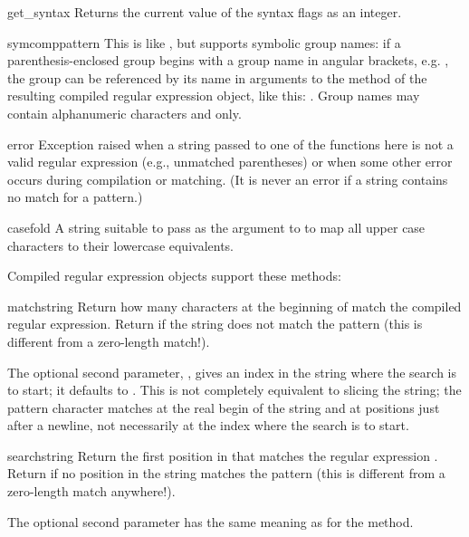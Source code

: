 \begin{funcdesc}{get_syntax}{}
  Returns the current value of the syntax flags as an integer.
\end{funcdesc}

\begin{funcdesc}{symcomp}{pattern}
This is like , but supports symbolic group names: if a
parenthesis-enclosed group begins with a group name in angular
brackets, e.g. , the group can
be referenced by its name in arguments to the  method of
the resulting compiled regular expression object, like this:
.  Group names may contain alphanumeric characters
and  only.
\end{funcdesc}

\begin{excdesc}{error}
  Exception raised when a string passed to one of the functions here
  is not a valid regular expression (e.g., unmatched parentheses) or
  when some other error occurs during compilation or matching.  (It is
  never an error if a string contains no match for a pattern.)
\end{excdesc}

\begin{datadesc}{casefold}
A string suitable to pass as the  argument to
 to map all upper case characters to their lowercase
equivalents.
\end{datadesc}

\noindent
Compiled regular expression objects support these methods:

\begin{funcdesc}{match}{string}
  Return how many characters at the beginning of  match
  the compiled regular expression.  Return  if the string
  does not match the pattern (this is different from a zero-length
  match!).
  
  The optional second parameter, , gives an index in the string
  where the search is to start; it defaults to .  This is not
  completely equivalent to slicing the string; the  pattern
  character matches at the real begin of the string and at positions
  just after a newline, not necessarily at the index where the search
  is to start.
\end{funcdesc}

\begin{funcdesc}{search}{string}
  Return the first position in  that matches the regular
  expression .  Return  if no position in the
  string matches the pattern (this is different from a zero-length
  match anywhere!).
  
  The optional second parameter has the same meaning as for the
   method.
\end{funcdesc}

